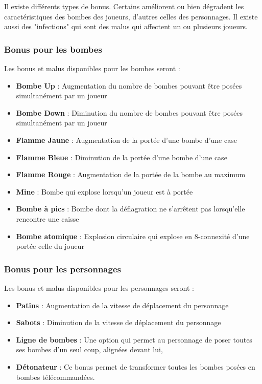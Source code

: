 Il existe différents types de bonus. Certains améliorent ou bien dégradent les caractéristiques des bombes des joueurs, d'autres celles des personnages. Il existe aussi des "infections" qui sont des malus qui affectent un ou plusieurs joueurs.

\subsubsection{Bonus pour les bombes}

Les bonus et malus disponibles pour les bombes seront :
\begin{itemize}
\item \textbf{Bombe Up} : Augmentation du nombre de bombes pouvant être posées simultanément par un joueur
\item \textbf{Bombe Down} : Diminution du nombre de bombes pouvant être posées simultanément par un joueur
\item \textbf{Flamme Jaune} : Augmentation de la portée d'une bombe d'une case
\item \textbf{Flamme Bleue} : Diminution de la portée d'une bombe d'une case
\item \textbf{Flamme Rouge} : Augmentation de la portée de la bombe au maximum
\item \textbf{Mine} : Bombe qui explose lorsqu'un joueur est à portée
\item \textbf{Bombe à pics} : Bombe dont la déflagration ne s'arrêtent pas lorsqu'elle rencontre une caisse
\item \textbf{Bombe atomique} : Explosion circulaire qui explose en 8-connexité d'une portée celle du joueur
\end{itemize}

\subsubsection{Bonus pour les personnages}

Les bonus et malus disponibles pour les personnages seront :
\begin{itemize}
\item \textbf{Patins} : Augmentation de la vitesse de déplacement du personnage
\item \textbf{Sabots} : Diminution de la vitesse de déplacement du personnage
\item \textbf{Ligne de bombes} : Une option qui permet au personnage de poser toutes ses bombes d'un seul coup, alignées devant lui,
\item \textbf{Détonateur} : Ce bonus permet de transformer toutes les bombes posées en bombes télécommandées.
\end{itemize}

